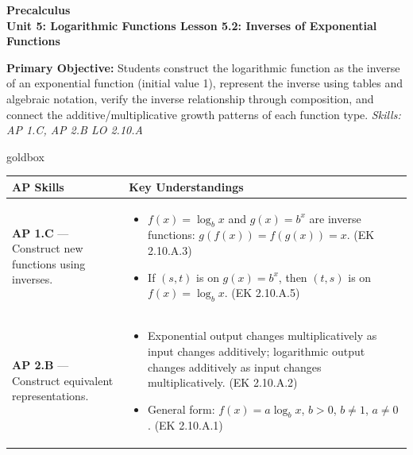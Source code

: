 \documentclass[10pt]{article}
\newcommand{\CourseName}{Precalculus}
\newcommand{\UnitNumberName}{Unit 5: Logarithmic Functions \quad}
\newcommand{\LessonNumberName}{Lesson 5.2: Inverses of Exponential Functions}
\begin{document}
\begin{center}
    {\Large\bfseries \CourseName \\
    {\small\bfseries \UnitNumberName \LessonNumberName}}
\end{center}

\begin{tcolorbox}[colback=sky, colframe=navy, boxrule=0.9pt, arc=2mm,
    left=2mm, right=2mm, top=1.5mm, bottom=1.5mm]
    \textbf{Primary Objective:} Students construct the logarithmic function as the inverse of
    an exponential function (initial value 1), represent the inverse using tables and algebraic
    notation, verify the inverse relationship through composition, and connect the
    additive/multiplicative growth patterns of each function type.
    \hfill\textit{\small Skills: AP 1.C, AP 2.B \quad LO 2.10.A}
\end{tcolorbox}

\renewcommand{\arraystretch}{1.6}
\begin{skillbox}{goldbox}
\begin{tabularx}{\linewidth}{@{}X X@{}}
\textbf{AP Skills} &
\textbf{Key Understandings} \\
\midrule
\textbf{AP 1.C} --- Construct new functions using inverses. &
\begin{itemize}[leftmargin=1.2em,itemsep=2pt,topsep=0pt]
  \item $f(x) = \log_b x$ and $g(x) = b^x$ are inverse functions:
        $g(f(x)) = f(g(x)) = x$. (EK 2.10.A.3)
  \item If $(s,t)$ is on $g(x) = b^x$, then $(t,s)$ is on $f(x) = \log_b x$.
        (EK 2.10.A.5)
\end{itemize} \\
\textbf{AP 2.B} --- Construct equivalent representations. &
\begin{itemize}[leftmargin=1.2em,itemsep=2pt,topsep=0pt]
  \item Exponential output changes multiplicatively as input changes additively;
        logarithmic output changes additively as input changes multiplicatively.
        (EK 2.10.A.2)
  \item General form: $f(x) = a\log_b x$, $b > 0$, $b \ne 1$, $a \ne 0$.
        (EK 2.10.A.1)
\end{itemize} \\
\end{tabularx}
\end{skillbox}
\end{document}
